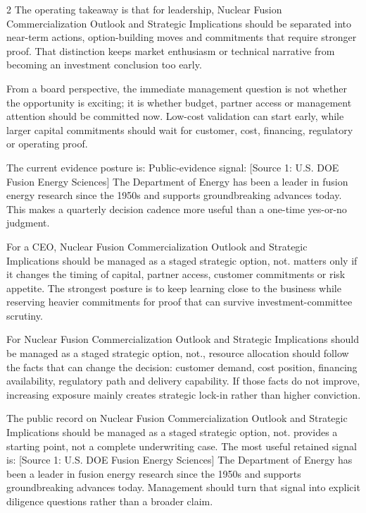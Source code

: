\documentclass[10pt,a4paper]{article}
\begin{document}
\begin{multicols}{2}
{\small The operating takeaway is that for leadership, Nuclear Fusion Commercialization Outlook and Strategic Implications should be separated into near-term actions, option-building moves and commitments that require stronger proof. That distinction keeps market enthusiasm or technical narrative from becoming an investment conclusion too early.}\par
{\small From a board perspective, the immediate management question is not whether the opportunity is exciting; it is whether budget, partner access or management attention should be committed now. Low-cost validation can start early, while larger capital commitments should wait for customer, cost, financing, regulatory or operating proof.}\par
{\small The current evidence posture is: Public-evidence signal: [Source 1: U.S. DOE Fusion Energy Sciences] The Department of Energy has been a leader in fusion energy research since the 1950s and supports groundbreaking advances today. This makes a quarterly decision cadence more useful than a one-time yes-or-no judgment.}\par
{\small For a CEO, Nuclear Fusion Commercialization Outlook and Strategic Implications should be managed as a staged strategic option, not. matters only if it changes the timing of capital, partner access, customer commitments or risk appetite. The strongest posture is to keep learning close to the business while reserving heavier commitments for proof that can survive investment-committee scrutiny.}\par
{\small For Nuclear Fusion Commercialization Outlook and Strategic Implications should be managed as a staged strategic option, not., resource allocation should follow the facts that can change the decision: customer demand, cost position, financing availability, regulatory path and delivery capability. If those facts do not improve, increasing exposure mainly creates strategic lock-in rather than higher conviction.}\par
{\small The public record on Nuclear Fusion Commercialization Outlook and Strategic Implications should be managed as a staged strategic option, not. provides a starting point, not a complete underwriting case. The most useful retained signal is: [Source 1: U.S. DOE Fusion Energy Sciences] The Department of Energy has been a leader in fusion energy research since the 1950s and supports groundbreaking advances today. Management should turn that signal into explicit diligence questions rather than a broader claim.}\par
\end{multicols}
\label{chap:4:end}
\end{document}
